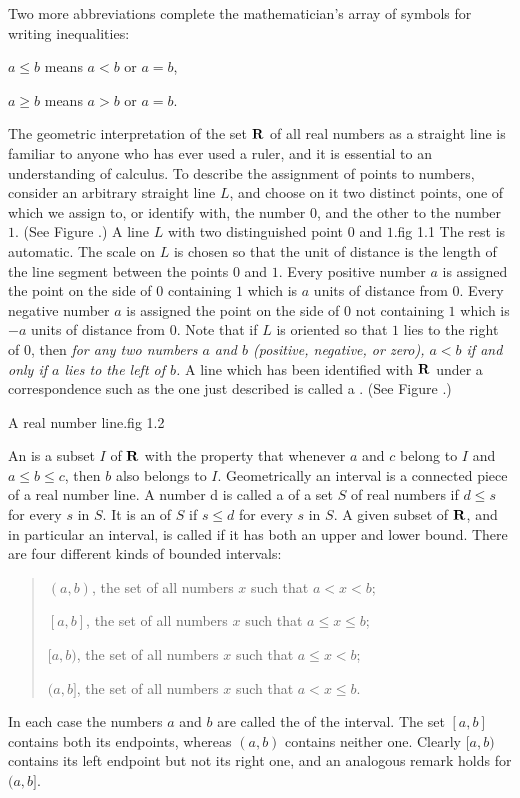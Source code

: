 Two more abbreviations complete the mathematician's array of symbols
for writing inequalities:

$a \leq b$ means $a < b$ or $a=b$,

$a \geq b$ means $a > b$ or $a=b$.

The geometric interpretation of the set $\mathrm{\bf R}$ of all real numbers
as a straight line is familiar to anyone who has ever used a ruler,
and it is essential to an understanding of calculus.
To describe the assignment of points to numbers,
consider an arbitrary straight line $L$,
and choose on it two distinct points,
one of which we assign to, or identify with, the number $0$,
and the other to the number $1$.
(See Figure .)
{A line $L$ with two distinguished point $0$ and $1$.}{fig 1.1}
The rest is automatic.
The scale on $L$ is chosen so that the unit of distance is
the length of the line segment between the points $0$ and $1$.
Every positive number $a$ is assigned the point on the side of $0$
containing $1$ which is $a$ units of distance from $0$.
Every negative number $a$ is assigned the point on the side of $0$
not containing $1$ which is $-a$ units of distance from $0$.
Note that if $L$ is oriented so that $1$ lies to the right of $0$,
then
\emph{
for any two numbers $a$ and $b$ (positive, negative, or zero),
$a < b$ if and only if $a$ lies to the  left of $b$.}
A line which has been identified with $\mathrm{\bf R}$ under a correspondence
such as the one just described is called a .
(See Figure .)

{A real number line.}{fig 1.2}

An 
is a subset $I$ of $\mathrm{\bf R}$ with the property that
whenever $a$ and $c$ belong to $I$ and $a \leq b \leq c$,
then $b$ also belongs to $I$.
Geometrically an interval is a connected piece of a real number line.
A number d is called a  of a set $S$ of real numbers
if $d \leq s$ for every $s$ in $S$.
It is an  of $S$ if $s \leq d$ for every $s$ in $S$.
A given subset of $\mathrm{\bf R}$, and in particular an interval,
is called  if it has both an upper and lower bound.
There are four different kinds of bounded intervals:
\begin{quote}
$(a, b)$, the set of all numbers $x$ such that  $a < x < b$;

$[a, b]$, the set of all numbers $x$ such that  $a \leq x \leq b$;

$[a, b)$, the set of all numbers $x$ such that  $a \leq x < b$;

$(a, b]$, the set of all numbers $x$ such that  $a < x \leq b$.
\end{quote}
In each case the numbers $a$ and $b$
are called the  of the interval.
The set $[a, b]$ contains both its endpoints,
whereas $(a, b)$ contains neither one.
Clearly $[a, b)$ contains its left endpoint but not its right one,
and an analogous remark holds for $(a, b]$.

